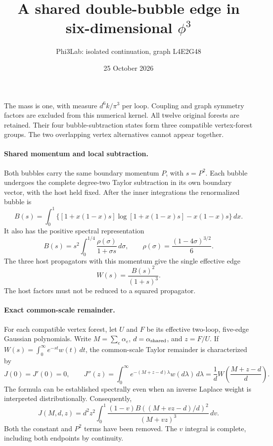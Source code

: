 \documentclass[11pt]{article}
\title{A shared double-bubble edge in six-dimensional \(\phi^3\)}
\author{Phi3Lab: isolated continuation, graph L4E2G48}
\date{25 October 2026}
\begin{document}
\maketitle
The mass is one, with measure \(d^6k/\pi^3\) per loop. Coupling and graph symmetry factors are excluded from this numerical kernel. All twelve original forests are retained. Their four bubble-subtraction states form three compatible vertex-forest groups. The two overlapping vertex alternatives cannot appear together.

\paragraph{Shared momentum and local subtraction.}
Both bubbles carry the same boundary momentum \(P\), with \(s=P^2\). Each bubble undergoes the complete degree-two Taylor subtraction in its own boundary vector, with the host held fixed. After the inner integrations the renormalized bubble is
\[
 B(s)=\int_0^1\{[1+x(1-x)s]\log[1+x(1-x)s]-x(1-x)s\}\,dx .
\]
It also has the positive spectral representation
\[
 B(s)=s^2\int_0^{1/4}\frac{\rho(\sigma)}{1+\sigma s}\,d\sigma,\qquad
 \rho(\sigma)=\frac{(1-4\sigma)^{3/2}}6 .
\]
The three host propagators with this momentum give the single effective edge
\[
 W(s)=\frac{B(s)^2}{(1+s)^3}.
\]
The host factors must not be reduced to a squared propagator.

\paragraph{Exact common-scale remainder.}
For each compatible vertex forest, let \(U\) and \(F\) be its effective two-loop, five-edge Gaussian polynomials. Write \(M=\sum_e\alpha_e\), \(d=\alpha_{\rm shared}\), and \(z=F/U\).
If \(W(s)=\int_0^\infty e^{-s t}w(t)\,dt\), the common-scale Taylor remainder is characterized by
\[
 J(0)=J'(0)=0,\qquad
 J''(z)=\int_0^\infty e^{-(M+z-d)\lambda}w(d\lambda)\,d\lambda
       =\frac1d W\!\left(\frac{M+z-d}{d}\right).
\]
The formula can be established spectrally even when an inverse Laplace weight is interpreted distributionally. Consequently,
\[
 J(M,d,z)=d^2z^2\int_0^1
 \frac{(1-v) B((M+vz-d)/d)^2}{(M+vz)^3}\,dv .
\]
Both the constant and \(P^2\) terms have been removed. The \(v\) integral is complete, including both endpoints by continuity.
\end{document}
